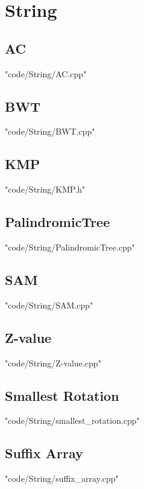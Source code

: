 \section{String}
\subsection{AC}
 {"code/String/AC.cpp"}
\subsection{BWT}
 {"code/String/BWT.cpp"}
\subsection{KMP}
 {"code/String/KMP.h"}
\subsection{PalindromicTree}
 {"code/String/PalindromicTree.cpp"}
\subsection{SAM}
 {"code/String/SAM.cpp"}
\subsection{Z-value}
 {"code/String/Z-value.cpp"}
\subsection{Smallest Rotation}
 {"code/String/smallest_rotation.cpp"}
\subsection{Suffix Array}
 {"code/String/suffix_array.cpp"}




